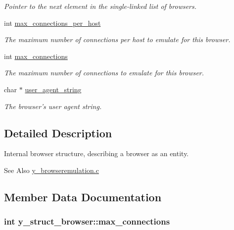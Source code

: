 \begin{DoxyCompactItemize}
\begin{DoxyCompactList}\small\item\em Pointer to the next element in the single-\/linked list of browsers. \end{DoxyCompactList}\item 
int \hyperlink{structy__struct__browser_a0cf9edfc677c4e9e69b9dea4f78b5bdc}{max\-\_\-connections\-\_\-per\-\_\-host}
\begin{DoxyCompactList}\small\item\em The maximum number of connections per host to emulate for this browser. \end{DoxyCompactList}\item 
int \hyperlink{structy__struct__browser_a9c64bfa81ef64854552dc880b7a765b0}{max\-\_\-connections}
\begin{DoxyCompactList}\small\item\em The maximum number of connections to emulate for this browser. \end{DoxyCompactList}\item 
\hypertarget{structy__struct__browser_a3af12a9867d2948b582dc79028725701}{char $\ast$ \hyperlink{structy__struct__browser_a3af12a9867d2948b582dc79028725701}{user\-\_\-agent\-\_\-string}}\label{structy__struct__browser_a3af12a9867d2948b582dc79028725701}

\begin{DoxyCompactList}\small\item\em The browser's user agent string. \end{DoxyCompactList}\end{DoxyCompactItemize}


\subsection{Detailed Description}
Internal browser structure, describing a browser as an entity. 

\begin{DoxySeeAlso}{See Also}
\hyperlink{y__browseremulation_8c}{y\-\_\-browseremulation.\-c} 
\end{DoxySeeAlso}


\subsection{Member Data Documentation}
\hypertarget{structy__struct__browser_a9c64bfa81ef64854552dc880b7a765b0}{
\subsubsection[{max\-\_\-connections}]{\setlength{\rightskip}{0pt plus 5cm}int y\-\_\-struct\-\_\-browser\-::max\-\_\-connections}}\label{structy__struct__browser_a9c64bfa81ef64854552dc880b7a765b0}


